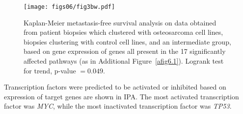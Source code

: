 \begin{figure}[htbp]
  \centering
  \begin{minipage}[b]{0.50\linewidth}
    \texttt{[image: figs06/fig3bw.pdf]}		%
  \end{minipage}
    \hfill
  \begin{minipage}[b]{0.46\linewidth}
     \caption{Kaplan\hyp{}Meier metastasis\hyp{}free survival analysis on data obtained from patient biopsies which clustered with osteosarcoma cell lines, biopsies clustering with control cell lines, and an intermediate group, based on gene expression of genes all present in the 17 significantly affected pathways (as in Additional Figure~\ref{afig6.1}). Logrank test for trend, p-value $=0.049$.}
     \label{fig6.3}
     \end{minipage}
\end{figure}
%
Transcription factors were predicted to be activated or inhibited based on expression of target genes are shown in IPA. The most activated transcription factor was {\it MYC}, while the most inactivated transcription factor was {\it TP53}.


